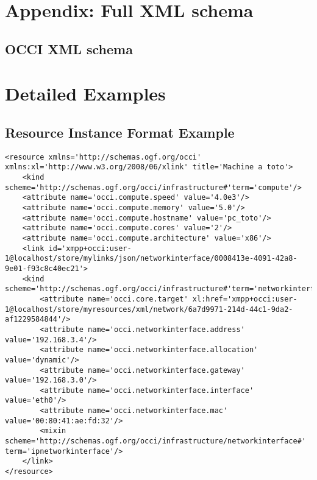 \documentclass[10pt,a4paper]{article}
\begin{document}
\section{Appendix: Full XML schema}
\label{sec:full_xml_schema}

\subsection{OCCI XML schema}
\label{sec:occi_xml_schema}



\section{Detailed Examples}
\label{sec:examples}


\subsection{Resource Instance Format Example}
\label{sec:example_resource}

\begin{lstlisting}
<resource xmlns='http://schemas.ogf.org/occi' xmlns:xl='http://www.w3.org/2008/06/xlink' title='Machine a toto'>
	<kind scheme='http://schemas.ogf.org/occi/infrastructure#'term='compute'/>
	<attribute name='occi.compute.speed' value='4.0e3'/>
	<attribute name='occi.compute.memory' value='5.0'/>
	<attribute name='occi.compute.hostname' value='pc_toto'/>
	<attribute name='occi.compute.cores' value='2'/>
	<attribute name='occi.compute.architecture' value='x86'/>
	<link id='xmpp+occi:user-1@localhost/store/mylinks/json/networkinterface/0008413e-4091-42a8-9e01-f93c8c40ec21'>
	<kind scheme='http://schemas.ogf.org/occi/infrastructure#'term='networkinterface'/>
		<attribute name='occi.core.target' xl:href='xmpp+occi:user-1@localhost/store/myresources/xml/network/6a7d9971-214d-44c1-9da2-af1229584844'/>
		<attribute name='occi.networkinterface.address' value='192.168.3.4'/>
		<attribute name='occi.networkinterface.allocation' value='dynamic'/>
		<attribute name='occi.networkinterface.gateway' value='192.168.3.0'/>
		<attribute name='occi.networkinterface.interface' value='eth0'/>
		<attribute name='occi.networkinterface.mac' value='00:80:41:ae:fd:32'/>
		<mixin scheme='http://schemas.ogf.org/occi/infrastructure/networkinterface#' term='ipnetworkinterface'/>
	</link>
</resource>
\end{lstlisting}
\end{document}
